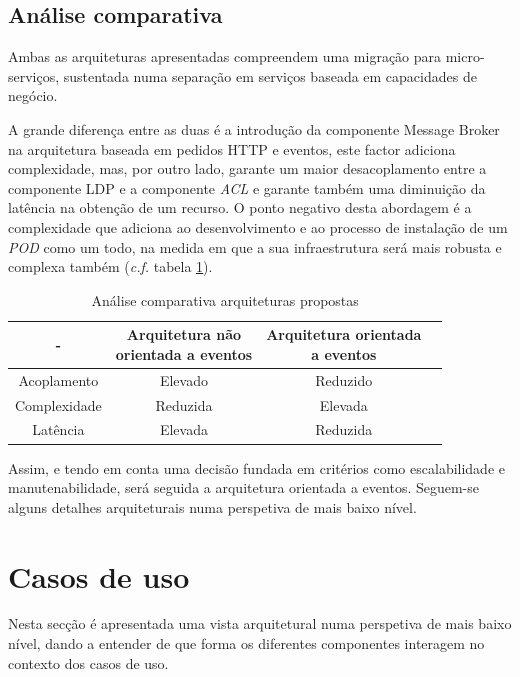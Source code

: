 \subsection{Análise comparativa \label{conclusão_arquitetura}}
Ambas as arquiteturas apresentadas compreendem uma migração para micro-serviços, sustentada numa separação em serviços baseada em capacidades de negócio.

A grande diferença entre as duas é a introdução da componente Message Broker na arquitetura baseada em pedidos HTTP e eventos, este factor adiciona complexidade, mas, por outro lado, garante um maior desacoplamento entre a componente \acrshort{LDP} e a componente \emph{\acrshort{ACL}} e garante também uma diminuição da latência na obtenção de um recurso. O ponto negativo desta abordagem é a complexidade que adiciona ao desenvolvimento e ao processo de instalação de um \emph{\acrshort{POD}} como um todo, na medida em que a sua infraestrutura será mais robusta e complexa também (\emph{c.f.} tabela \ref{table_comparacao_arquiteturas}).

\begin{table}[h]
\centering
\caption{Análise comparativa arquiteturas propostas}
\vspace{0.5cm}
\label{table_comparacao_arquiteturas}
\begin{tabular}{c|c|c|c} 
- & \specialcell{Arquitetura não\\orientada a eventos}  &\specialcell{Arquitetura orientada\\a eventos} \\
\hline                          
Acoplamento & Elevado & Reduzido \\
Complexidade & Reduzida & Elevada \\
Latência & Elevada & Reduzida \\
\end{tabular}
\end{table}

Assim, e tendo em conta uma decisão fundada em critérios como escalabilidade e manutenabilidade, será seguida a arquitetura orientada a eventos. Seguem-se alguns detalhes arquiteturais numa perspetiva de mais baixo nível.

\section{Casos de uso}
Nesta secção é apresentada uma vista arquitetural numa perspetiva de mais baixo nível, dando a entender de que forma os diferentes componentes interagem no contexto dos casos de uso.


